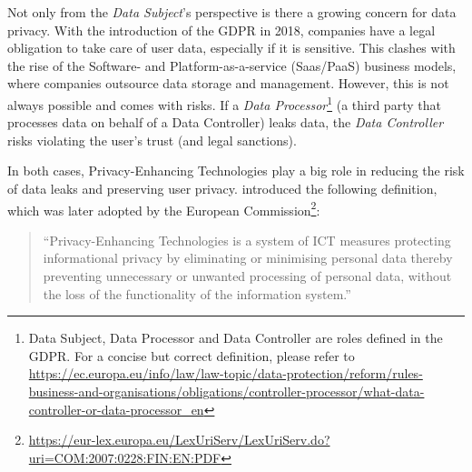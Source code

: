Not only from the \textit{Data Subject}'s perspective is there a growing concern for data privacy. With the introduction of the \gls{GDPR} in 2018, companies have a legal obligation to take care of user data, especially if it is sensitive. This clashes with the rise of the Software- and Platform-as-a-service (Saas/PaaS) business models, where companies outsource data storage and management. However, this is not always possible and comes with risks. If a \textit{Data Processor}\footnote{Data Subject, Data Processor and Data Controller are roles defined in the \gls{GDPR}. For a concise but correct definition, please refer to \url{https://ec.europa.eu/info/law/law-topic/data-protection/reform/rules-business-and-organisations/obligations/controller-processor/what-data-controller-or-data-processor_en}} (a third party that processes data on behalf of a Data Controller) leaks data, the \textit{Data Controller} risks violating the user's trust (and legal sanctions).

In both cases, Privacy-Enhancing Technologies play a big role in reducing the risk of data leaks and preserving user privacy. \citeauthor{pets-handbook} introduced the following definition, which was later adopted by the European Commission\footnote{\url{https://eur-lex.europa.eu/LexUriServ/LexUriServ.do?uri=COM:2007:0228:FIN:EN:PDF}}:
\begin{quote}{\citeauthor{pets-handbook}}
    ``Privacy-Enhancing Technologies is a system of ICT measures protecting informational privacy by eliminating or minimising personal data thereby preventing unnecessary or unwanted processing of personal data, without the loss of the functionality of the information system.''
\end{quote} 

